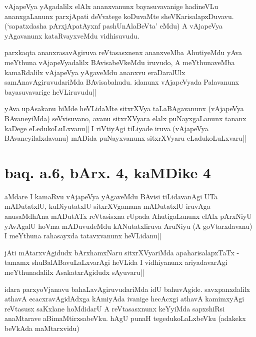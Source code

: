 \begin{artha}
vAjapeVya yAgadalilx elAlx ananxvanunx bayasuvavanige hadineVLu 
ananxgaLanunx parxjApati deVvatege koDuvaMte sheVKarisalapxDuvavu. 
(`sapatxdasha pArxjApatAyxnf pashUnAlaBeVta' eMdu) A vAjapeVya 
yAgavanunx kataRvayxveMdu vidhisuvudu.
\end{artha}

\begin{artha}
parxkaqta ananxrasavAgiruva reVtasasxnenx ananxveMba AhutiyeMdu yAva 
meYthuna vAjapeVyadalilx BAvisabeVkeMdu iruvudo, A meYthunaveMba 
kamaRdalilx vAjapeVya yAgaveMdu ananxvu eraDaralUlx 
samAnavAgiruvudariMda BAvisabahudu. idanunx vAjapeVyada Palavanunx 
bayasuvavarige heVLiruvudu||
\end{artha}


\begin{artha}
yAva upAsakanu hiMde heVLidaMte sitxrXVya taLaBAgavanunx (vAjapeVya 
BAvaneyiMda) seVvisuvano, avanu sitxrXVyara elalx puNayxgaLanunx 
tananx kaDege eLedukoLuLxvanu|| \stext I riVtiyAgi tiLiyade iruva 
(vAjapeVya BAvaneyilalxdavanu) mADida puNayxvanunx sitxrXVyaru 
eLadukoLuLxvaru||
\end{artha}

\section*{baq. a.6, bArx. 4, kaMDike 4}

\stext

\begin{artha}
aMdare I kamaRvu vAjapeVya yAgaveMdu BAvisi tiLidavanAgi UTa 
mADutatxlU, kuDiyutatxlU sitxrXVgamana mADutatxlU iruvAga anusaMdhAna 
mADutATx reVtasisxna rUpada AhutigaLanunx elAlx pArxNiyU yAvAgalU 
hoVma mADuvudeMdu kANutatxliruva AruNiyu (A goVtarxdavanu) I meYthuna 
rahasayxda tatavxvanunx heVLidanu||
\end{artha}


\begin{artha}
jAti mAtarxvAgidudx bArxhamxNaru sitxrXVyariMda apaharisalapxTaTx - 
tamamx shuBalABavuLaLxvarAgi heVLida I vidhiyanunx ariyadavarAgi 
meYthunadalilx AsakatxrAgidudx sAyuvaru||
\end{artha}

\begin{artha}
idara parxyoVjanavu bahaLavAgiruvudariMda idU bahuvAgide. 
savxpanxdalilx athavA ecacxravAgidAdxga kAmiyAda ivanige hecAcxgi 
athavA kamimxyAgi reVtasusx saKxlane hoMdidarU A reVtasasxnunx 
keYyiMda sapxshiRsi anaMtarave aBimaMtirxsabeVku. hAgU punaH 
tegedukoLaLxbeVku (adakekx beVkAda maMtarxvidu)
\end{artha}

